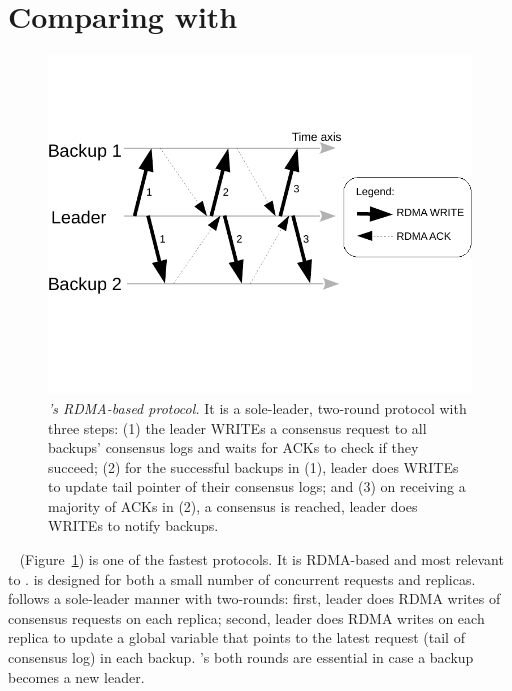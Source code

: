 % 

\section{Comparing \xxx with \dare}\label{sec:compare}

\begin{figure}[t]
\centering
\vspace{-.4in}
\includegraphics[width=.35\textwidth]{figures/dare_algo}
\vspace{-.53in}
\caption{{\em \dare's RDMA-based protocol.} It is a sole-leader, 
two-round protocol with three steps: (1) the leader WRITEs a consensus request 
to all backups' consensus logs and waits for ACKs to check if they succeed; 
(2) for the successful backups in (1), leader does WRITEs to update tail 
pointer of their consensus logs; and (3) on receiving a majority of ACKs in 
(2), a consensus is reached, leader does WRITEs to notify backups.}
\label{fig:dare}
\vspace{-.20in}
\end{figure}

\dare~\cite{dare:hpdc15} (Figure~\ref{fig:dare}) is one of 
the fastest \paxos protocols. It is RDMA-based and most relevant to \xxx. \dare 
is designed for both a small number of concurrent requests and 
replicas. \dare follows a sole-leader manner with two-rounds: 
first, leader does RDMA writes of consensus requests on each replica; second, 
leader does RDMA writes on each replica to update a global variable that points 
to the latest request (tail of consensus log) in each backup. \dare's both 
rounds are essential in case a backup becomes a new leader.

% 


